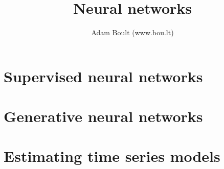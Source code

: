 \documentclass[oneside]{book}
\begin{document}
\author{Adam Boult (www.bou.lt)}
\title{Neural networks}
\maketitle

\setcounter{tocdepth}{0}
\tableofcontents



\part{Supervised neural networks}











\part{Generative neural networks}





\part{Estimating time series models}


\end{document}
